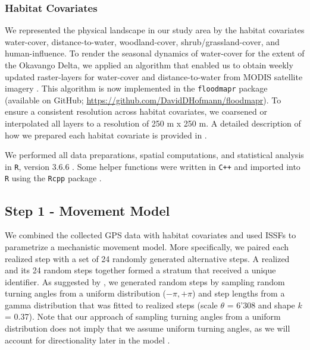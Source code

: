 \documentclass[abstract=on,10pt,a4paper,bibliography=totocnumbered]{article}
\begin{document}
\subsubsection{Habitat Covariates}
We represented the physical landscape in our study area by the habitat
covariates \textsf{water-cover, distance-to-water, woodland-cover,
shrub/grassland-cover, and human-influence}. To render the seasonal dynamics of
water-cover for the extent of the Okavango Delta, we applied an algorithm that
enabled us to obtain weekly updated raster-layers for \textsf{water-cover} and
\textsf{distance-to-water} from MODIS satellite imagery \citep{Wolski.2017,
Hofmann.2021}. This algorithm is now implemented in the {\tt floodmapr} package
(available on GitHub; \url{https://github.com/DavidDHofmann/floodmapr}). To
ensure a consistent resolution across habitat covariates, we coarsened or
interpolated all layers to a resolution of 250 m x 250 m. A detailed description
of how we prepared each habitat covariate is provided in \cite{Hofmann.2021}.

We performed all data preparations, spatial computations, and statistical
analysis in {\tt R}, version 3.6.6 \citep{R.2020}. Some helper functions were
written in {\tt C++} and imported into {\tt R} using the {\tt Rcpp} package
\citep{Eddelbuettel.2011, Eddelbuettel.2013, Eddelbuettel.2018}.

\subsection{Step 1 - Movement Model}
We combined the collected GPS data with habitat covariates and used ISSFs
\citep{Avgar.2016} to parametrize a mechanistic movement model. More
specifically, we paired each realized step with a set of 24 randomly generated
alternative steps. A realized and its 24 random steps together formed a stratum
that received a unique identifier. As suggested by \cite{Avgar.2016}, we
generated random steps by sampling random turning angles from a uniform
distribution (\(-\pi, +\pi\)) and step lengths from a gamma distribution that
was fitted to realized steps (scale \(\theta\) = 6'308 and shape \(k\) = 0.37).
Note that our approach of sampling turning angles from a uniform distribution
does not imply that we assume uniform turning angles, as we will account for
directionality later in the model \citep{Avgar.2016, Fieberg.2021}.
\end{document}
